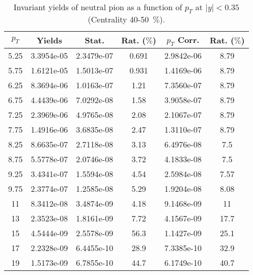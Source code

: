             
\begin{table}[!htb]
\centering
\begin{tabular}{|c|c|c|c|c|c|}
\hline
$p_{T}$ & Yields & Stat. & Rat. ($\%$) & $p_{T}$ Corr. & Rat. ($\%$) \\
\hline
5.25 & 3.3954e-05 & 2.3479e-07 & 0.691 & 2.9842e-06 & 8.79 \\ 
5.75 & 1.6121e-05 & 1.5013e-07 & 0.931 & 1.4169e-06 & 8.79 \\ 
6.25 & 8.3694e-06 & 1.0163e-07 & 1.21 & 7.3560e-07 & 8.79 \\ 
6.75 & 4.4439e-06 & 7.0292e-08 & 1.58 & 3.9058e-07 & 8.79 \\ 
7.25 & 2.3969e-06 & 4.9765e-08 & 2.08 & 2.1067e-07 & 8.79 \\ 
7.75 & 1.4916e-06 & 3.6835e-08 & 2.47 & 1.3110e-07 & 8.79 \\ 
8.25 & 8.6635e-07 & 2.7118e-08 & 3.13 & 6.4976e-08 & 7.5 \\ 
8.75 & 5.5778e-07 & 2.0746e-08 & 3.72 & 4.1833e-08 & 7.5 \\ 
9.25 & 3.4341e-07 & 1.5594e-08 & 4.54 & 2.5984e-08 & 7.57 \\ 
9.75 & 2.3774e-07 & 1.2585e-08 & 5.29 & 1.9204e-08 & 8.08 \\ 
11 & 8.3412e-08 & 3.4874e-09 & 4.18 & 9.1468e-09 & 11 \\ 
13 & 2.3523e-08 & 1.8161e-09 & 7.72 & 4.1567e-09 & 17.7 \\ 
15 & 4.5444e-09 & 2.5578e-09 & 56.3 & 1.1427e-09 & 25.1 \\ 
17 & 2.2328e-09 & 6.4455e-10 & 28.9 & 7.3385e-10 & 32.9 \\ 
19 & 1.5173e-09 & 6.7855e-10 & 44.7 & 6.1749e-10 & 40.7 \\ 
\hline
\end{tabular}
\caption{Invariant yields of neutral pion as a function of $p_{T}$ at $|y|<0.35$ (Centrality 40-50~$\%$).}
\end{table}
            

